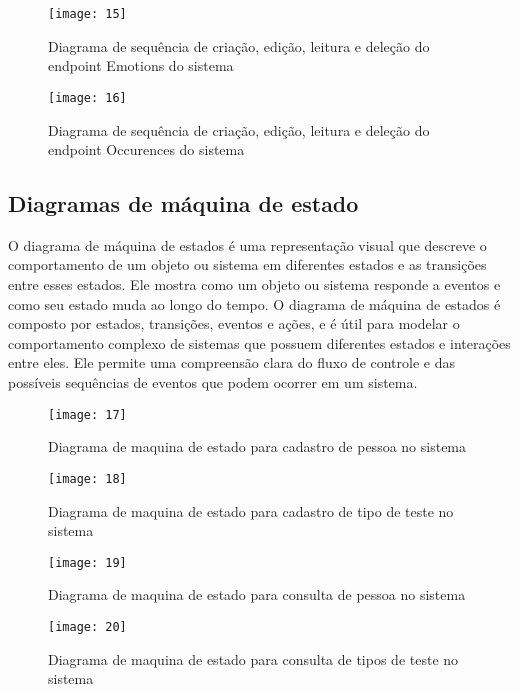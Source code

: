 \begin{figure}[h]
  \caption{Diagrama de sequência de criação, edição, leitura e deleção do endpoint Emotions do sistema}
  \centering
  \texttt{[image: 15]}
  \label{fig:15}
\end{figure}
\FloatBarrier

\begin{figure}[h]
  \caption{Diagrama de sequência de criação, edição, leitura e deleção do endpoint Occurences do sistema}
  \centering
  \texttt{[image: 16]}
  \label{fig:16}
\end{figure}
\FloatBarrier

\subsection{Diagramas de máquina de estado}

O diagrama de máquina de estados \cite{30} é uma representação visual que descreve o comportamento de um objeto ou sistema em diferentes estados e as transições entre esses estados. Ele mostra como um objeto ou sistema responde a eventos e como seu estado muda ao longo do tempo. O diagrama de máquina de estados é composto por estados, transições, eventos e ações, e é útil para modelar o comportamento complexo de sistemas que possuem diferentes estados e interações entre eles. Ele permite uma compreensão clara do fluxo de controle e das possíveis sequências de eventos que podem ocorrer em um sistema.

\begin{figure}[h]
  \caption{Diagrama de maquina de estado para cadastro de pessoa no sistema}
  \centering
  \texttt{[image: 17]}
  \label{fig:17}
\end{figure}
\FloatBarrier

\begin{figure}[h]
  \caption{Diagrama de maquina de estado para cadastro de tipo de teste no sistema}
  \centering
  \texttt{[image: 18]}
  \label{fig:18}
\end{figure}
\FloatBarrier

\begin{figure}[h]
  \caption{Diagrama de maquina de estado para consulta de pessoa no sistema}
  \centering
  \texttt{[image: 19]}
  \label{fig:19}
\end{figure}
\FloatBarrier

\begin{figure}[h]
  \caption{Diagrama de maquina de estado para consulta de tipos de teste no sistema}
  \centering
  \texttt{[image: 20]}
  \label{fig:20}
\end{figure}
\FloatBarrier

